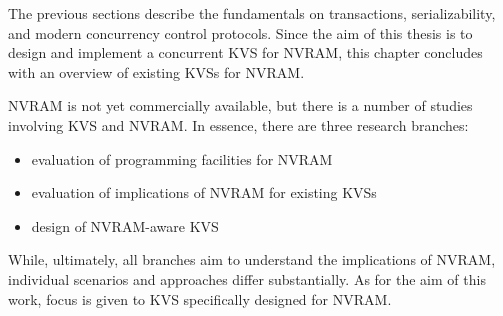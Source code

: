 
The previous sections describe the fundamentals on transactions,
serializability, and modern concurrency control protocols.  Since the aim of
this thesis is to design and implement a concurrent \ac{KVS} for \ac{NVRAM},
this chapter concludes with an overview of existing \acp{KVS} for \ac{NVRAM}.

\ac{NVRAM} is not yet commercially available, but there is a number of studies
involving \ac{KVS} and \ac{NVRAM}. In essence, there are three research
branches:

\begin{itemize}
    \item evaluation of programming facilities for \ac{NVRAM}
    \item evaluation of implications of \ac{NVRAM} for existing \acp{KVS}
    \item design of \ac{NVRAM}-aware \ac{KVS}
\end{itemize}

While, ultimately, all branches aim to understand the implications of
\ac{NVRAM}, individual scenarios and approaches differ substantially. As for the
aim of this work, focus is given to \ac{KVS} specifically designed for
\ac{NVRAM}.



